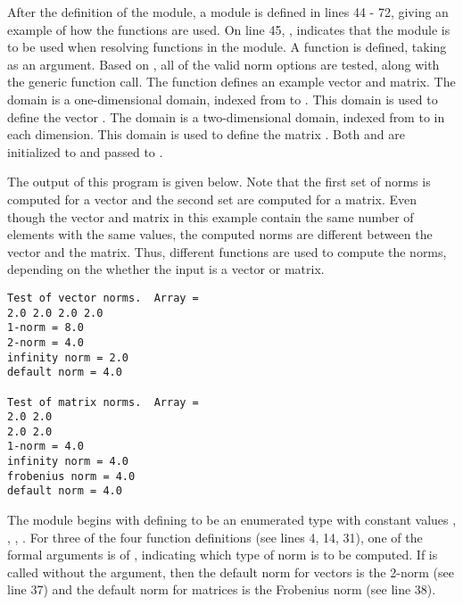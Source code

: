 After the definition of the  module, a  module
is defined in lines 44 - 72, giving an example of how the  functions are used.
On line 45, , indicates that the  module is to be
used when resolving functions in the  module.  A 
function is defined, taking  as an argument.  Based on ,
all of the valid norm options are tested, along with the generic 
function call.  The  function defines an example vector and matrix.
The domain  is a one-dimensional domain, indexed
from  to .  This domain is used to define the vector
.  The domain  is a two-dimensional domain, indexed from 
to  in each dimension.  This domain is used to define the matrix .
Both  and  are initialized to  and passed to
.

The output of this program is given below.  Note that the first set
of norms is computed for a vector and the second set are computed for
a matrix. Even though the vector and matrix in this example contain
the same number of elements with the same values, the computed norms
are different between the vector and the matrix.  Thus, different
functions are used to compute the norms, depending on the whether the
input is a vector or matrix.

\begin{verbatim}
Test of vector norms.  Array = 
2.0 2.0 2.0 2.0
1-norm = 8.0
2-norm = 4.0
infinity norm = 2.0
default norm = 4.0

Test of matrix norms.  Array = 
2.0 2.0
2.0 2.0
1-norm = 4.0
infinity norm = 4.0
frobenius norm = 4.0
default norm = 4.0
\end{verbatim}

The  module begins with defining  to be an
enumerated type with constant values , , 
, .
For three of the four  function definitions (see lines 4, 14, 31), 
one of the formal arguments is of , indicating which type of norm 
is to be computed.  If  is called without the  argument,
then the default norm for vectors is the 2-norm (see line 37) and the default
norm for matrices is the Frobenius norm (see line 38).  

